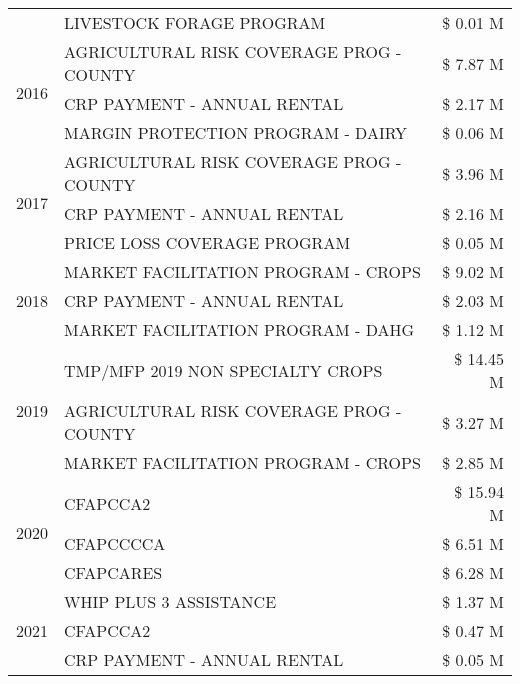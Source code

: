 \begin{tabular}{llr}
 & LIVESTOCK FORAGE PROGRAM & \$ 0.01 M \\
\cline{1-3}
\multirow[t]{3}{*}{2016} & AGRICULTURAL RISK COVERAGE PROG - COUNTY & \$ 7.87 M \\
 & CRP PAYMENT - ANNUAL RENTAL & \$ 2.17 M \\
 & MARGIN PROTECTION PROGRAM - DAIRY & \$ 0.06 M \\
\cline{1-3}
\multirow[t]{3}{*}{2017} & AGRICULTURAL RISK COVERAGE PROG - COUNTY & \$ 3.96 M \\
 & CRP PAYMENT - ANNUAL RENTAL & \$ 2.16 M \\
 & PRICE LOSS COVERAGE PROGRAM & \$ 0.05 M \\
\cline{1-3}
\multirow[t]{3}{*}{2018} & MARKET FACILITATION PROGRAM - CROPS & \$ 9.02 M \\
 & CRP PAYMENT - ANNUAL RENTAL & \$ 2.03 M \\
 & MARKET FACILITATION PROGRAM - DAHG & \$ 1.12 M \\
\cline{1-3}
\multirow[t]{3}{*}{2019} & TMP/MFP 2019 NON SPECIALTY CROPS & \$ 14.45 M \\
 & AGRICULTURAL RISK COVERAGE PROG - COUNTY & \$ 3.27 M \\
 & MARKET FACILITATION PROGRAM - CROPS & \$ 2.85 M \\
\cline{1-3}
\multirow[t]{3}{*}{2020} & CFAPCCA2 & \$ 15.94 M \\
 & CFAPCCCCA & \$ 6.51 M \\
 & CFAPCARES & \$ 6.28 M \\
\cline{1-3}
\multirow[t]{3}{*}{2021} & WHIP PLUS 3 ASSISTANCE & \$ 1.37 M \\
 & CFAPCCA2 & \$ 0.47 M \\
 & CRP PAYMENT - ANNUAL RENTAL & \$ 0.05 M \\
\cline{1-3}
\bottomrule
\end{tabular}
